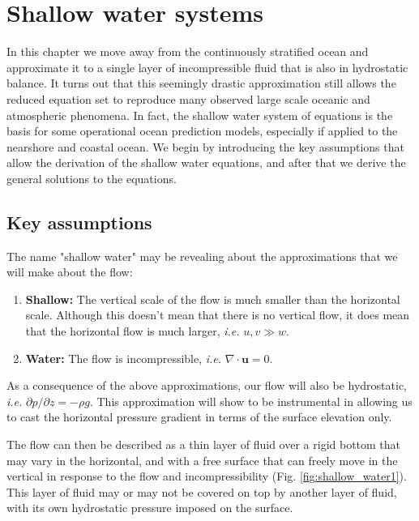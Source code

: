 \documentclass[12pt]{article}
\numberwithin{equation}{section}
\numberwithin{figure}{section}
\numberwithin{table}{section}
\begin{document}
\newpage
\section{Shallow water systems}
\label{sec:shallow_water_systems}

In this chapter we move away from the continuously stratified ocean and
approximate it to a single layer of incompressible fluid that is also in
hydrostatic balance.
It turns out that this seemingly drastic approximation still allows the
reduced equation set to reproduce many observed large scale oceanic and
atmospheric phenomena.
In fact, the shallow water system of equations is the basis for some operational
ocean prediction models, especially if applied to the nearshore and coastal
ocean.
We begin by introducing the key assumptions that allow the derivation of the
shallow water equations, and after that we derive the general solutions to the
equations.

\subsection{Key assumptions}

The name "shallow water" may be revealing about the approximations that we will
make about the flow:

\begin{enumerate}
  \item \textbf{Shallow:} The vertical scale of the flow is much smaller than the
    horizontal scale. Although this doesn't mean that there is no vertical
    flow, it does mean that the horizontal flow is much larger,
    \textit{i.e.} $u, v \gg w$.
  \item \textbf{Water:} The flow is incompressible, \textit{i.e.}
  $\nabla \cdot \mathbf{u} = 0$.
\end{enumerate}
As a consequence of the above approximations, our flow will also be hydrostatic,
\textit{i.e.} $\partial p / \partial z = -\rho g$.
This approximation will show to be instrumental in allowing us to cast the 
horizontal pressure gradient in terms of the surface elevation only.

The flow can then be described as a thin layer of fluid over a rigid bottom
that may vary in the horizontal, and with a free surface that can freely
move in the vertical in response to the flow and incompressibility
(Fig. \ref{fig:shallow_water1}).
This layer of fluid may or may not be covered on top by another layer of fluid,
with its own hydrostatic pressure imposed on the surface.
\end{document}
